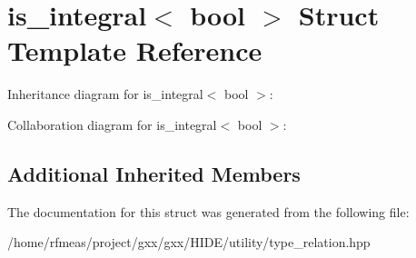 \hypertarget{structis__integral_3_01bool_01_4}{}\section{is\+\_\+integral$<$ bool $>$ Struct Template Reference}
\label{structis__integral_3_01bool_01_4}


Inheritance diagram for is\+\_\+integral$<$ bool $>$\+:


Collaboration diagram for is\+\_\+integral$<$ bool $>$\+:
\subsection*{Additional Inherited Members}


The documentation for this struct was generated from the following file\+:\begin{DoxyCompactItemize}
\item 
/home/rfmeas/project/gxx/gxx/\+H\+I\+D\+E/utility/type\+\_\+relation.\+hpp\end{DoxyCompactItemize}
